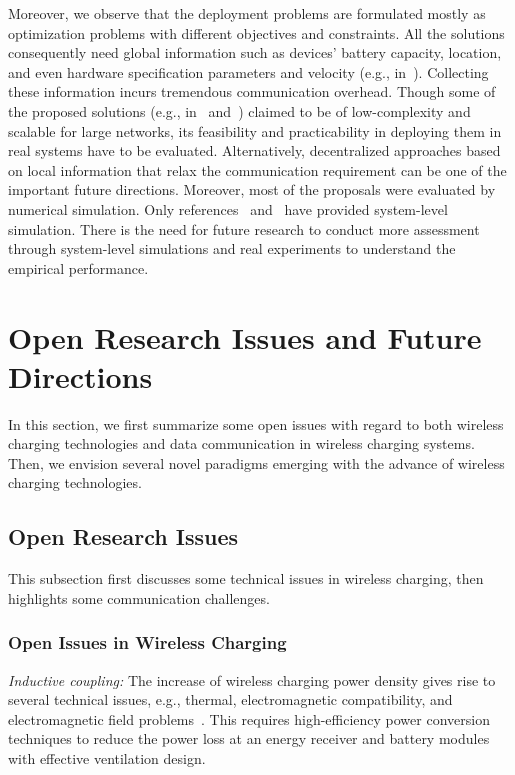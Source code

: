 \documentclass[twocolumn,10pt]{IEEEtran}
\begin{document}
Moreover, we observe that the deployment problems are formulated mostly as optimization problems with different objectives and constraints. All the solutions consequently need global information such as devices' battery capacity, location, and even hardware specification parameters and velocity (e.g., in~\cite{C2012Chiu}). Collecting these information incurs tremendous communication overhead. Though some of the proposed solutions (e.g., in~\cite{C2012Chiu} and~\cite{Erol-Kantarci2012Suresense}) claimed to be of low-complexity and scalable for large networks, its feasibility and practicability in deploying them in real systems have to be evaluated. Alternatively, decentralized approaches based on local information that relax the communication requirement can be one of the important future directions. Moreover, most of the proposals were evaluated by numerical simulation. Only references~\cite{S2013He} and~\cite{J.2014Liao} have provided system-level simulation. There is the need for future research to conduct more assessment through system-level simulations and real experiments to understand the empirical performance.  

 

\section{Open Research Issues and Future Directions}
\label{sec:futureissues}

In this section, we first summarize some open issues with regard to both wireless charging technologies and data communication in wireless charging systems. Then, we envision several novel paradigms
emerging with the advance of wireless charging technologies.

\subsection{Open Research Issues}

This subsection first discusses some technical issues in wireless charging, then highlights some communication challenges. 

\subsubsection{Open Issues in Wireless Charging}

{\em Inductive coupling:} The increase of wireless charging power density gives rise to several technical issues, e.g., thermal, electromagnetic compatibility, and electromagnetic field problems~\cite{Y2013Hui}. This requires high-efficiency power conversion techniques to reduce the power loss at an energy receiver and battery modules with effective ventilation design.
\end{document}
